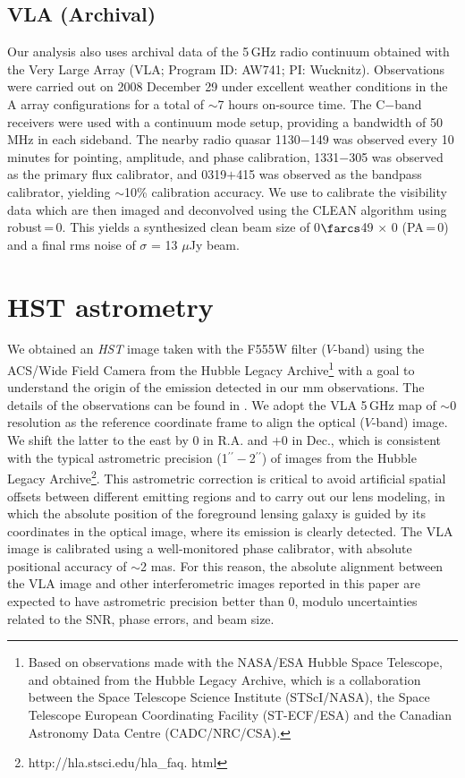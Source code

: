 \documentclass[]{emulateapj}
\begin{document}
\subsection{VLA (Archival)} %
Our analysis also uses archival data of the 5\,GHz
radio continuum obtained with the
Very Large Array (VLA; Program ID: AW741; PI: Wucknitz).
Observations were carried out on 2008 December 29 under excellent weather
conditions in the A array configurations for a total of $\sim$7 hours on-source time. The C$-$band receivers were used with a continuum mode setup,
providing a bandwidth of 50 MHz in each sideband.
The nearby radio quasar 1130$-$149 was observed every 10 minutes for
pointing, amplitude, and phase calibration, 1331$-$305 was observed as the
primary flux calibrator, and 0319$+$415 was observed as the bandpass
calibrator, yielding $\sim$10\% calibration accuracy.
We use  to calibrate the visibility data which
are then imaged and deconvolved using
the CLEAN algorithm using robust\,=\,0. This yields a synthesized clean
beam size of 0$\farcs$49 $\times$ 0 (PA\,=\,0) and a final
rms noise of $\sigma$ = 13 $\mu$Jy beam\pmOne.


\section{HST astrometry} \label{sec:HST}
We obtained an {\it HST} image taken with the F555W filter ($V$-band)
using the ACS/Wide Field Camera from the
Hubble Legacy Archive\footnote{Based on observations
made with the NASA/ESA Hubble Space Telescope, and obtained from the Hubble
Legacy Archive, which is a collaboration between the Space Telescope Science
Institute (STScI/NASA), the Space Telescope European Coordinating Facility
(ST-ECF/ESA) and the Canadian Astronomy Data Centre (CADC/NRC/CSA).}
with a goal to understand the origin of the emission detected
in our mm observations. The details of the observations can be found
in \citet[hereafter C06]{Claeskens06a}.
We adopt the VLA 5\,GHz map of
$\sim$0 resolution as the
reference coordinate frame to align the optical ($V$-band) image.
We shift the latter to the east by 0 in R.A. and $+$0 in
Dec., which is consistent with the typical astrometric precision (1$^{\prime\prime}-$2$^{\prime\prime}$) of
images from the Hubble Legacy Archive\footnote{http://hla.stsci.edu/hla\_faq.
html}. This astrometric correction is critical to avoid artificial spatial
offsets between different emitting regions and to carry out our lens modeling,
in which the absolute position of the foreground lensing galaxy is guided by its
coordinates in the optical image, where its emission is clearly detected.
The VLA image is calibrated using a well-monitored phase
calibrator, with absolute positional accuracy of $\sim$2 mas.
For this reason, the absolute alignment between the VLA image and other
interferometric images reported in this paper are expected to have astrometric
precision better than 0, modulo uncertainties related to the SNR, phase
errors, and beam size.
\end{document}
